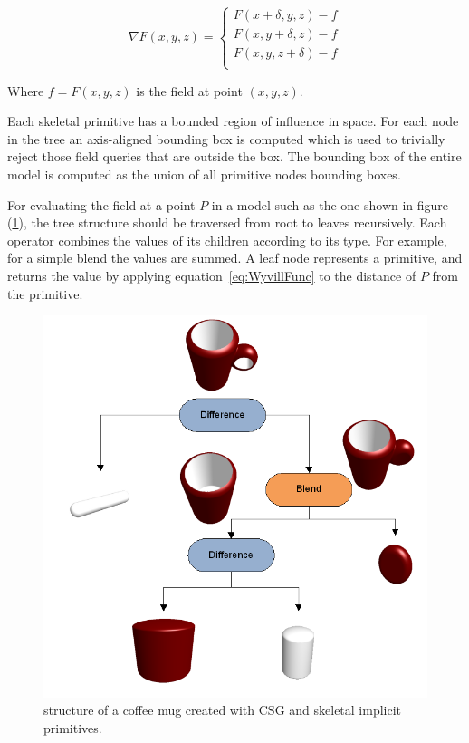 \begin{equation}
\nabla F(x,y,z)=\left\{ \begin{array}{rl}
 F(x+\delta,y,z)-f \\
 F(x, y +\delta,z)-f \\
 F(x, y, z+\delta)-f \\
  \end{array} \right. 
\label{eq:Normal}
\end{equation}

Where $f = F(x,y,z)$ is the field at point $(x,y,z)$.

Each skeletal primitive has a bounded region of influence in space. For each node in the tree an
axis-aligned bounding box is computed which is used to trivially reject those field queries that 
are outside the box. The bounding box of the entire model is computed as the union of all primitive
nodes bounding boxes.

For evaluating the field  at a point $P$ in a \blob model such as the one shown in figure (\ref{fig:CoffeeMugBlobTree}), 
the tree structure should be traversed from root to leaves recursively. Each operator combines the values of its children 
according to its type. For example, for a simple blend the values are summed. A leaf node represents a primitive,  and 
returns the value by applying equation~\ref{eq:WyvillFunc} to the distance of $P$ from the primitive.

\begin{figure}[H]
\centering
  \includegraphics[width=1.0\linewidth]{figures/intro/CoffeeMugBlobTree}
  \caption{\blob structure of a coffee mug created with CSG and skeletal implicit primitives.}
  \label{fig:CoffeeMugBlobTree}
\end{figure}

